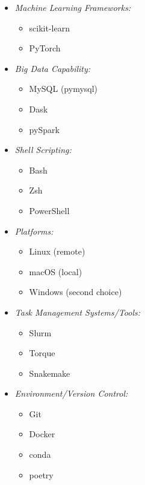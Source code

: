 \begin{multicols}{3}
\begin{itemize}
      
    \item \textit{Machine Learning Frameworks:}  
    \begin{itemize}  
        \item scikit-learn  
        \item PyTorch  
    \end{itemize}  



    \item \textit{Big Data Capability:}  
    \begin{itemize}  
        \item MySQL (pymysql)  
        \item Dask  
        \item pySpark  
    \end{itemize}  
  
    \item \textit{Shell Scripting:}  
    \begin{itemize}  
        \item Bash  
        \item Zsh  
        \item PowerShell  
    \end{itemize}  
  
\end{itemize}  
  
\columnbreak %
  
\begin{itemize}  
    \item \textit{Platforms:}  
    \begin{itemize}  
        \item Linux (remote)
        \item macOS (local)
        \item Windows (second choice)
    \end{itemize} 

    \item \textit{Task Management Systems/Tools:}  
    \begin{itemize}  
        \item Slurm
        \item Torque
        \item Snakemake
    \end{itemize} 

    \item \textit{Environment/Version Control:}  
    \begin{itemize}  
        \item Git
        \item Docker
        \item conda
        \item poetry
    \end{itemize} 


\end{itemize}
\end{multicols}
